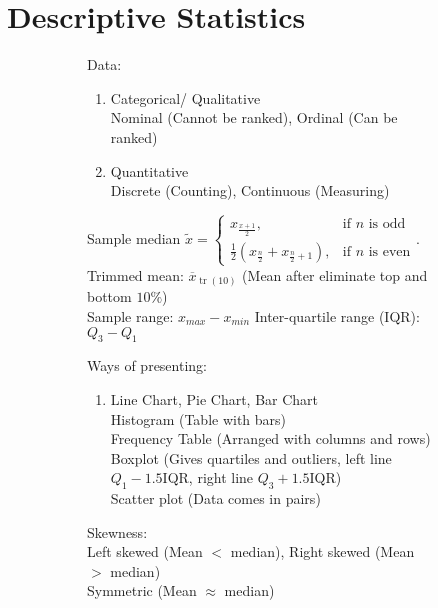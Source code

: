 \documentclass{article}
\DeclareMathOperator{\tr}{tr}
\begin{document}
\section{Descriptive Statistics}
\begin{figure}[h!]
\vspace*{-10px}
\begin{subfigure}[h!]{0.5\textwidth}
Data:
\begin{enumerate}
        \item Categorical/ Qualitative\\
        Nominal (Cannot be ranked), Ordinal (Can be ranked)
        \item Quantitative\\
        Discrete (Counting), Continuous (Measuring)
\end{enumerate}
Sample median $\widetilde{x}=\begin{cases}
    x_{\frac{x+1}{2}}, &\text{if $n$ is odd}\\
    \frac{1}{2}(x_{\frac{n}{2}}+x_{\frac{n}{2}+1}), &\text{if $n$ is even}
\end{cases}$.\\
Trimmed mean: $\overline{x}_{\tr(10)}$ (Mean after eliminate top and bottom $10\%$)\\
Sample range: $x_{max}-x_{min}$ \quad Inter-quartile range (IQR): $Q_{3}-Q_{1}$
\end{subfigure}
\begin{subfigure}[h!]{0.49\textwidth}
    Ways of presenting:
    \begin{enumerate}
        \item Line Chart, Pie Chart, Bar Chart\\
        Histogram (Table with bars)\\
        Frequency Table (Arranged with columns and rows)\\
        Boxplot (Gives quartiles and outliers, left line $Q_{1}-1.5$IQR, right line $Q_{3}+1.5$IQR)\\
        Scatter plot (Data comes in pairs)
    \end{enumerate}
    Skewness:\\
    Left skewed (Mean $<$ median), Right skewed (Mean $>$ median)\\
    Symmetric (Mean $\approx$ median)\\
\end{subfigure}
\end{figure}
\end{document}
